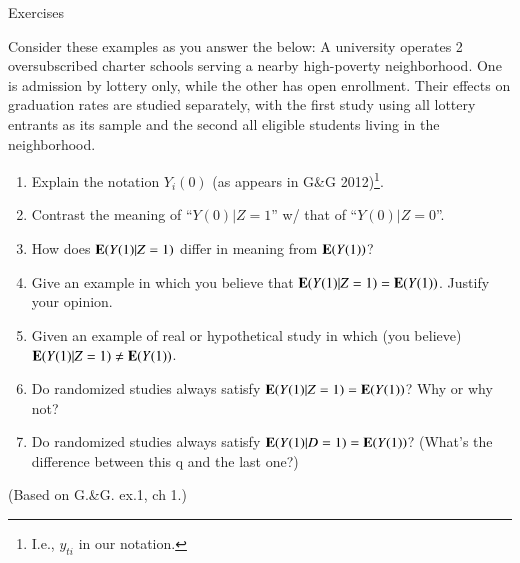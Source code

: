 \begin{frame}{Exercises}

Consider these examples as you answer the below: A university operates 2 oversubscribed charter schools
serving a nearby high-poverty neighborhood.  One is admission by
lottery only, while the other has open enrollment.  Their effects on
graduation rates are studied separately, with the first study using
all lottery entrants as its sample and the second all eligible
students living in the neighborhood. 

    \begin{enumerate}
    \item Explain the notation $Y_{i}(0)$ (as appears in G\&G
      2012)\footnote{I.e., $y_{ti}$ in our notation.}.
    \item Contrast the meaning of ``$Y(0) | Z=1$'' w/ that of ``$Y(0) | Z=0$''.
    \item How does $\mathbf{E}(Y(1) | Z=1)$ differ in meaning from $\mathbf{E}(Y(1))$?
    \item Give an example in which you believe that $\mathbf{E}(Y(1) | Z=1) =
      \mathbf{E}(Y(1))$.  Justify your opinion. 
    \item Given an example of real or hypothetical study in which (you
      believe)$\mathbf{E}(Y(1) | Z=1) \neq \mathbf{E}(Y(1))$.
    \item Do randomized studies always satisfy $\mathbf{E}(Y(1) | Z=1)
      = \mathbf{E}(Y(1))$?  Why or why not?
    \item Do randomized studies always satisfy $\mathbf{E}(Y(1) | D=1)
      = \mathbf{E}(Y(1))$?  (What's the difference between this q and
      the last one?)
    \end{enumerate}
(Based on G.\&G. ex.1, ch 1.)

\end{frame}




